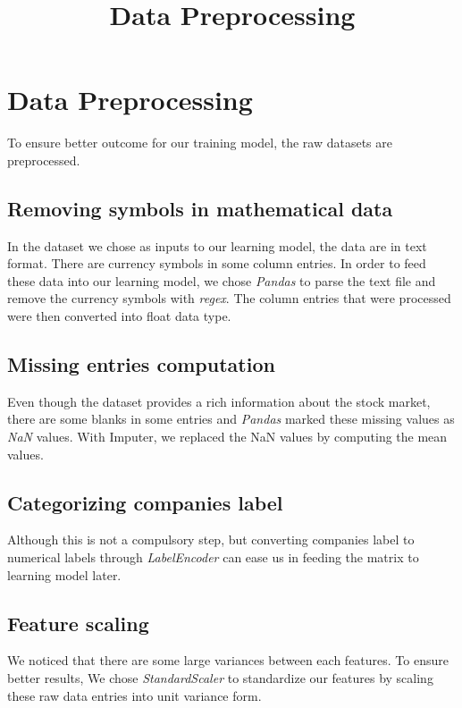 \documentclass{article}
\title{Data Preprocessing}
\author{
  Shi Ji Chew\thanks
  CS 532 Fall 2017\\
  Department of Computer Science\\
  University of Wisconsin-Madison\\
  Madison, WI 53703 \\
  \texttt{schew2@wisc.edu} \\
}
\begin{document}

\maketitle

\section{Data Preprocessing}

To ensure better outcome for our training model, the raw datasets are preprocessed.

\subsection{Removing symbols in mathematical data}
In the dataset we chose as inputs to our learning model, the data are in text format. There are currency symbols in some column entries. In order to feed these data into our learning model, we chose \emph{Pandas} to parse the text file and remove the currency symbols with \emph{regex}. The column entries that were processed were then converted into float data type.

\subsection{Missing entries computation}
Even though the dataset provides a rich information about the stock market, there are some blanks in some entries and \emph{Pandas} marked these missing values as \emph{NaN} values. With Imputer, we replaced the NaN values by computing the mean values.

\subsection{Categorizing companies label}
Although this is not a compulsory step, but converting companies label to numerical labels through \emph{LabelEncoder} can ease us in feeding the matrix to learning model later.

\subsection{Feature scaling}

We noticed that there are some large variances between each features. To ensure better results, We chose \emph{StandardScaler} to standardize our features by scaling these raw data entries into unit variance form.
\end{document}
